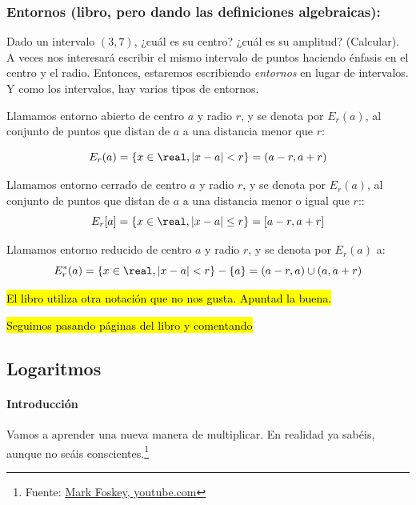 \subsubsection{Entornos (libro, pero dando las definiciones algebraicas):} Dado un intervalo $(3,7)$, ¿cuál es su centro? ¿cuál es su amplitud? (Calcular). A veces nos interesará escribir el mismo intervalo de puntos haciendo énfasis en el centro y el radio. 
%
Entonces, estaremos escribiendo \textit{entornos} en lugar de intervalos. 
%
Y como los intervalos, hay varios tipos de entornos.

\begin{defn}
Llamamos entorno abierto de centro $a$ y radio $r$, y se denota por $E_r(a)$, al conjunto de puntos que distan de $a$ a una distancia menor que $r$:

\[
	E_r(a) = \{x\in\real, |x-a| < r\} = (a-r, a+r) 
\]
\end{defn}

\begin{defn}
Llamamos entorno cerrado de centro $a$ y radio $r$, y se denota por $E_r(a)$, al conjunto de puntos que distan de $a$ a una distancia menor o igual que $r$::
\[
	E_r[a]  = \{x\in\real, |x-a| \leq r\} = [a-r, a+r]
\]
\end{defn}

\begin{defn}
Llamamos entorno reducido de centro $a$ y radio $r$, y se denota por $E_r(a)$ a:
\[
	E^{\ast}_r(a) = \{x\in\real, |x-a| < r\} - \{a\} = (a-r,a) \cup (a, a+r)
\]
\end{defn}

\hl{El libro utiliza otra notación que no nos gusta. Apuntad la buena.}

\hl{Seguimos pasando páginas del libro y comentando}

\subsection{Logaritmos}

\paragraph{Introducción}

Vamos a aprender una nueva manera de multiplicar. En realidad ya sabéis, aunque no seáis conscientes.\footnote{Fuente: \href{https://www.youtube.com/watch?v=FB3\_BeukBBk\&t=99s}{Mark Foskey, youtube.com}}



